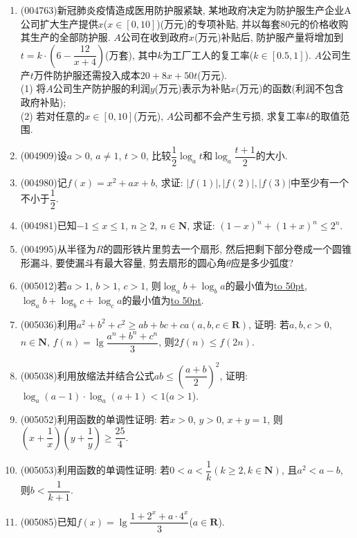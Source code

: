 \documentclass[10pt,a4paper]{article}
\newcommand{\blank}[1]{\underline{\hbox to #1pt{}}}
\newcommand{\bracket}[1]{(\hbox to #1pt{})}
\newcommand{\twoch}[4]{\par\begin{tabular}{p{.46\textwidth}p{.46\textwidth}}
A.~#1& B.~#2\\
C.~#3& D.~#4
\end{tabular}}
\begin{document}
\begin{enumerate}[1.]
$q_2$: 函数$y=f(x)$是定义域为$\mathbf{R}$的增函数, 存在$x_0<0$, 使得$f(x_0)=0$;\\
用这三个陈述句组成两个命题, 命题$S$: ``若$q_1$, 则$p$''; 命题$T$: ``若$q_2$, 则$p$''. 关于$S,T$以下说法正确的是\bracket{20}.
\twoch{只有命题$S$是真命题}{只有命题$T$是真命题}{两个命题$S,T$都是真命题}{两个命题$S,T$都不是真命题}
\item {\tiny (004763)}新冠肺炎疫情造成医用防护服紧缺, 某地政府决定为防护服生产企业A公司扩大生产提供$x$($x\in [0,10]$)(万元)的专项补贴, 并以每套$80$元的价格收购其生产的全部防护服. $A$公司在收到政府$x$(万元)补贴后, 防护服产量将增加到$t=k\cdot (6-\dfrac{12}{x+4})$(万套), 其中$k$为工厂工人的复工率($k\in [0.5,1]$). $A$公司生产$t$万件防护服还需投入成本$20+8x+50t$(万元).\\
(1) 将$A$公司生产防护服的利润$y$(万元)表示为补贴$x$(万元)的函数(利润不包含政府补贴);\\
(2) 若对任意的$x\in [0,10]$(万元), $A$公司都不会产生亏损, 求复工率$k$的取值范围.
\item {\tiny (004909)}设$a>0$, $a\ne 1$, $t>0$, 比较$\dfrac 12\log_at$和$\log_a\dfrac{t+1}2$的大小.
\item {\tiny (004980)}记$f(x)=x^2+ax+b$, 求证: $|f(1)|,|f(2)|,|f(3)|$中至少有一个不小于$\dfrac 12$.
\item {\tiny (004981)}已知$-1\le x\le 1$, $n\ge 2$, $n\in \mathbf{N}$, 求证: $(1-x)^n+(1+x)^n\le 2^n$.
\item {\tiny (004995)}从半径为$R$的圆形铁片里剪去一个扇形, 然后把剩下部分卷成一个圆锥形漏斗, 要使漏斗有最大容量, 剪去扇形的圆心角$\theta$应是多少弧度?
\item {\tiny (005012)}若$a>1$, $b>1$, $c>1$, 则$\log_ab+\log_ba$的最小值为\blank{50}, $\log_ab+\log_bc+\log_ca$的最小值为\blank{50}.
\item {\tiny (005036)}利用$a^2+b^2+c^2\ge ab+bc+ca(a,b,c\in \mathbf{R})$, 证明: 若$a,b,c>0$, $n\in \mathbf{N}$, $f(n)=\lg \dfrac{a^n+b^n+c^n}3$, 则$2f(n)\le f(2n)$.
\item {\tiny (005038)}利用放缩法并结合公式$ab\le (\dfrac{a+b}2)^2$, 证明: $\log_a(a-1)\cdot \log_a(a+1)<1$($a>1$).
\item {\tiny (005052)}利用函数的单调性证明: 若$x>0$, $y>0$, $x+y=1$, 则$(x+\dfrac 1x)(y+\dfrac 1y)\ge \dfrac{25}4$.
\item {\tiny (005053)}利用函数的单调性证明: 若$0<a<\dfrac 1k(k\ge 2,k\in \mathbf{N})$, 且$a^2<a-b$, 则$b<\dfrac 1{k+1}$.
\item {\tiny (005085)}已知$f(x)=\lg \dfrac{1+2^x+a\cdot 4^x}3$($a\in \mathbf{R}$).\\

\end{enumerate}
\end{document}
